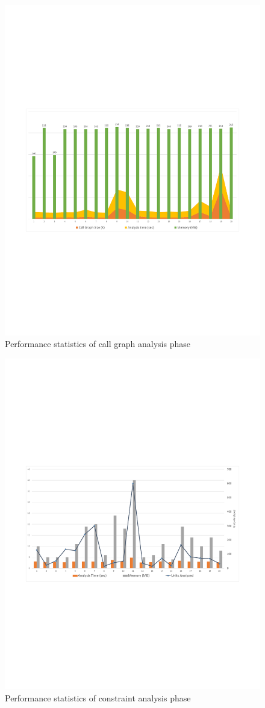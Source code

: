 \begin{figure}[t]
\centering
\includegraphics[scale = .5]{images/CallGraphHisto.pdf}
\caption{Performance statistics of call graph analysis phase}
\label{fig:callGraphHisto}
\end{figure}


\begin{figure}[t]
\centering
\includegraphics[scale = .5]{images/ConstraintHisto.pdf}
\caption{Performance statistics of constraint analysis phase}
\label{fig:constraintHisto}
\end{figure}
